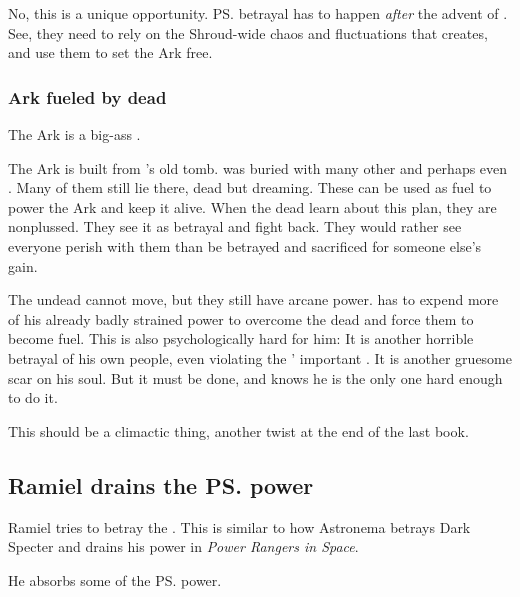No, this is a unique opportunity. 
\ps{\Azraid} betrayal has to happen \emph{after} the advent of \Lithrim. 
See, they need to rely on the Shroud-wide chaos and fluctuations that \Lithrim{} creates, and use them to set the Ark free. 





\subsubsection{Ark fueled by dead \ophidians}
The Ark is a big-ass . 

The Ark is built from \Sethicus's old tomb. 
\Sethicus was buried with many other \ophidians and perhaps even \dragons.
Many of them still lie there, dead but dreaming. 
These can be used as fuel to power the Ark and keep it alive. 
When the dead learn about this plan, they are nonplussed. 
They see it as betrayal and fight back. 
They would rather see everyone perish with them than be betrayed and sacrificed for someone else's gain. 

The undead cannot move, but they still have arcane power. 
\Ishnaruchaefir has to expend more of his already badly strained power to overcome the dead and force them to become fuel. 
This is also psychologically hard for him: 
It is another horrible betrayal of his own people, even violating the \dragons' important . 
It is another gruesome scar on his soul. 
But it must be done, and \Ishnaruchaefir knows he is the only one hard enough to do it. 

This should be a climactic thing, another  twist at the end of the last book. 









\subsection{Ramiel drains the \ps{\Voidbringer}{} power}
Ramiel tries to betray the \Voidbringer. 
This is similar to how Astronema betrays Dark Specter and drains his power in \emph{Power Rangers in Space}. 

He absorbs some of the \ps{\Voidbringer}{} power. 





